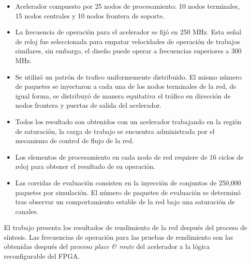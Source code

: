 \begin{itemize}

	\item Acelerador compuesto por 25 nodos de procesamiento: 10 nodos terminales, 15 nodos centrales y 10 nodos frontera de soporte.

	\item La frecuencia de operación para el acelerador se fijó en 250 MHz. Esta señal de reloj fue seleccionada para empatar velocidades de operación de trabajos similares, sin embargo, el diseño puede operar a frecuencias superiores a 300 MHz.

	\item Se utilizó un patrón de trafico uniformemente distribuido. El mismo número de paquetes se inyectaron a cada una de los nodos terminales de la red, de igual forma, se distribuyó de manera equitativa el tráfico en dirección de nodos frontera y puertas de salida del acelerador. 

	\item Todos los resultado son obtenidos con un acelerador trabajando en la región de saturación, la carga de trabajo se encuentra administrada por el mecanismo de control de flujo de la red.

	\item Los elementos de procesamiento en cada nodo de red requiere de 16 ciclos de reloj para obtener el resultado de su operación.

	\item Las corridas de evaluación consisten en la inyección de conjuntos de 250,000 paquetes por simulación. El número de paquetes de evaluación se determinó tras observar un comportamiento estable de la red bajo una saturación de canales.

\end{itemize}

El trabajo presenta los resultados de rendimiento de la red después del proceso de síntesis. Las frecuencias de operación para las pruebas de rendimiento son las obtenidas después del proceso \textit{place \& route} del acelerador a la lógica reconfigurable del FPGA.
